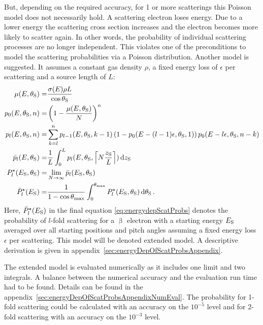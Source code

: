 But, depending on the required accuracy, for 1 or more scatterings this Poisson model does not necessarily hold. A scattering electron loses energy. Due to a lower energy the scattering cross section increases and the electron becomes more likely to scatter again. In other words, the probability of individual scattering processes are no longer independent. This violates one of the preconditions to model the scattering probabilities via a Poisson distribution. Another model is suggested. It assumes a constant gas density $\rho$, a fixed energy loss of $\epsilon$ per scattering and a source length of $L$:
\begin{subequations}
\label{eq:energydepScatProbsModel}
\begin{align}
    \mu(E,\theta_\mathrm{S}) =&
        \frac{\sigma(E)\rho L}{\cos\theta_\mathrm{S}} \\
    p_0(E,\theta_\mathrm{S},n) =&
        \left(
            1-\frac{\mu(E,\theta_\mathrm{S})}{N}
        \right)^n \\
    p_l(E,\theta_\mathrm{S},n) =&
        \sum_{k=l}^{n}
        p_{l-1}(E,\theta_\mathrm{S},k-1)
        \left(
            1-p_0(E-(l-1)\epsilon,\theta_\mathrm{S},1)
        \right)
        p_0(E-l\epsilon,\theta_\mathrm{S},n-k) \\
    \bar{p}_l(E,\theta_\mathrm{S}) =& 
        \frac{1}{L}
        \int_{0}^{L}
            p_l(E,\theta_\mathrm{S},
                \left\lceil N \frac{z_\mathrm{S}}{L}\right\rceil
            )
        \mathop{}\!\mathrm{d} z_\mathrm{S} 
        \label{eq:energydepScatProbsZAverage} \\
      P^{\star}_l(E_\mathrm{S},\theta_\mathrm{S}) =& 
        \lim_{N\rightarrow\infty} \bar{p}_l(E_\mathrm{S},\theta_\mathrm{S}) 
        \label{eq:energydepScatProbsLimit} \\ 
    \bar{P}^{\star}_l(E_\mathrm{S}) =& 
    \frac{1}{1-\cos\theta_\mathrm{max}}
    \int_0^{\theta_\mathrm{max}}
        P^{\star}_l(E_\mathrm{S},\theta_\mathrm{S}) 
        \mathop{}\!\mathrm{d} \theta_\mathrm{S}
        \label{eq:energydepScatProbs}
    \text{\,.}
\end{align}
\end{subequations}
Here, $\bar{P}^{\star}_l(E_\mathrm{S})$ in the final equation \eqref{eq:energydepScatProbs} denotes the probability of $l$-fold scattering for a $\upbeta$ electron with a starting energy $E_\mathrm{S}$ averaged over all starting positions and pitch angles assuming a fixed energy loss $\epsilon$ per scattering. This model will be denoted extended model. A descriptive derivation is given in \mbox{appendix \ref{sec:energyDepOfScatProbsAppendix}}. 

The extended model is evaluated numerically as it includes one limit and two integrals. A balance between the numerical accuracy and the evaluation run time had to be found. Details can be found in the \mbox{appendix \ref{sec:energyDepOfScatProbsAppendixNumEval}}. The probability for 1-fold scattering could be calculated with an accuracy on the $10^{-5}$ level and for 2-fold scattering with an accuracy on the $10^{-3}$ level.

